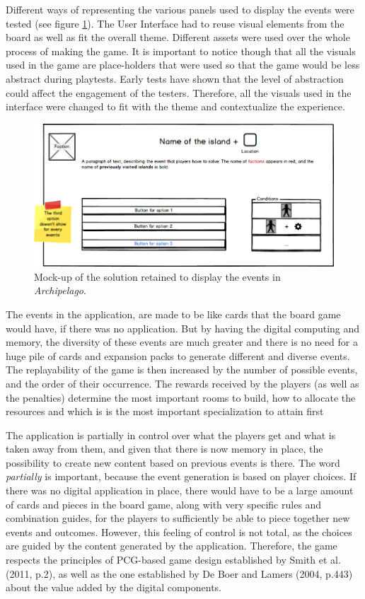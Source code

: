 Different ways of representing the various panels used to display the events were tested (see figure \ref{fig:uimockup}). The User Interface had to reuse visual elements from the board as well as fit the overall theme. Different assets were used over the whole process of making the game. It is important to notice though that all the visuals used in the game are place-holders that were used so that the game would be less abstract during playtests. Early tests have shown that the level of abstraction could affect the engagement of the testers. Therefore, all the visuals used in the interface were changed to fit with the theme and contextualize the experience.
\begin{figure}[!ht]
    \centering
    \includegraphics[width=\textwidth]{Images/event.png}
    \caption{Mock-up of the solution retained to display the events in \textit{Archipelago}.}
    \label{fig:uimockup}
\end{figure}

The events in the application, are made to be like cards that the board game would have, if there was no application. But by having the digital computing and memory, the diversity of these events are much greater and there is no need for a huge pile of cards and expansion packs to generate different and diverse events. The replayability of the game is then increased by the number of possible events, and the order of their occurrence. The rewards received by the players (as well as the penalties) determine the most important rooms to build, how to allocate the resources and which is is the most important specialization to attain first

The application is partially in control over what the players get and what is taken away from them, and given that there is now memory in place, the possibility to create new content based on previous events is there. The word \textit{partially} is important, because the event generation is based on player choices. If there was no digital application in place, there would have to be a large amount of cards and pieces in the board game, along with very specific rules and combination guides, for the players to sufficiently be able to piece together new events and outcomes. However, this feeling of control is not total, as the choices are guided by the content generated by the application. Therefore, the game respects the principles of PCG-based game design established by Smith et al. (2011, p.2)\cite{pdf:pcgbased}, as well as the one established by De Boer and Lamers (2004, p.443)\cite{chap:aug} about the value added by the digital components.

